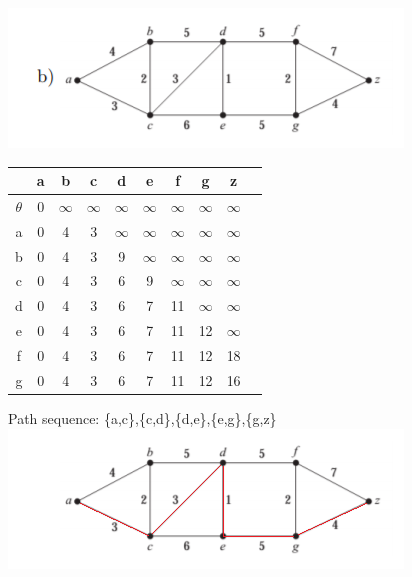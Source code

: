 \documentclass{article}
\begin{document}
\includegraphics[scale = 1.5]{Question 17/connectivity_17.b.png}
\begin{table}[h]
\begin{tabular}{c|c c c c c c c c c}

  & a & b & c & d & e & f & g & z \\ \hline
$\theta$ & 0 & $\infty$ & $\infty$ & $\infty$ & $\infty$ & $\infty$ & $\infty$ & $\infty$ \\
a & 0 & 4 & 3 & $\infty$ & $\infty$ & $\infty$ & $\infty$ & $\infty$ \\
b & 0 & 4 & 3 & 9 & $\infty$ & $\infty$ & $\infty$ & $\infty$ \\
c & 0 & 4 & 3 & 6 & 9 & $\infty$ & $\infty$ & $\infty$ \\
d & 0 & 4 & 3 & 6 & 7 & 11 & $\infty$ & $\infty$ \\
e & 0 & 4 & 3 & 6 & 7 & 11 & 12 & $\infty$ \\
f & 0 & 4 & 3 & 6 & 7 & 11 & 12 & 18 \\
g & 0 & 4 & 3 & 6 & 7 & 11 & 12 & 16 \\
\end{tabular}
\end{table}
\newline
Path sequence: \{a,c\},\{c,d\},\{d,e\},\{e,g\},\{g,z\}
\newline
\includegraphics[scale = 1.7]{Question 17/connectivity_17.b.edited.png}
\end{document}
